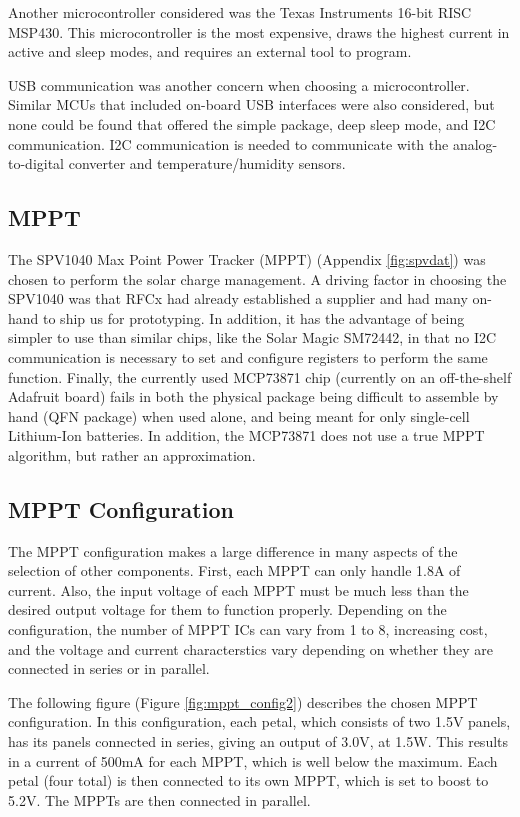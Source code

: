 \documentclass{article}
\numberwithin{figure}{section}
\numberwithin{equation}{section}
\begin{document}
{\bigskip
Another microcontroller considered was the Texas Instruments 16-bit RISC MSP430. This microcontroller is the most expensive, draws the highest current in active and sleep modes, and requires an external tool to program.

\bigskip
USB communication was another concern when choosing a microcontroller. Similar MCUs that included on-board USB interfaces were also considered, but none could be found that offered the simple package, deep sleep mode, and I2C communication. I2C communication is needed to communicate with the analog-to-digital converter and temperature/humidity sensors.

\bigskip


\subsection{MPPT} \label{sect:mppt_just}
The SPV1040 Max Point Power Tracker (MPPT) (Appendix \ref{fig:spvdat}) was chosen to perform the solar charge management. A driving factor in choosing the SPV1040 was that RFCx had already established a supplier and had many on-hand to ship us for prototyping. In addition, it has the advantage of being simpler to use than similar chips, like the Solar Magic SM72442, in that no I2C communication is necessary to set and configure registers to perform the same function. Finally, the currently used MCP73871 chip (currently on an off-the-shelf Adafruit board) fails in both the physical package being difficult to assemble by hand (QFN package) when used alone, and being meant for only single-cell Lithium-Ion batteries. In addition, the MCP73871 does not use a true MPPT algorithm, but rather an approximation.

\subsection{MPPT Configuration} \label{sect:mppt_config_just}
The MPPT configuration makes a large difference in many aspects of the selection of other components. First, each MPPT can only handle 1.8A of current. Also, the input voltage of each MPPT must be much less than the desired output voltage for them to function properly. Depending on the configuration, the number of MPPT ICs can vary from 1 to 8, increasing cost, and the voltage and current characterstics vary depending on whether they are connected in series or in parallel.

\bigskip
The following figure (Figure \ref{fig:mppt_config2}) describes the chosen MPPT configuration. In this configuration, each petal, which consists of two 1.5V panels, has its panels connected in series, giving an output of 3.0V, at 1.5W. This results in a current of 500mA for each MPPT, which is well below the maximum. Each petal (four total) is then connected to its own MPPT, which is set to boost to 5.2V. The MPPTs are then connected in parallel.

}
\end{document}
